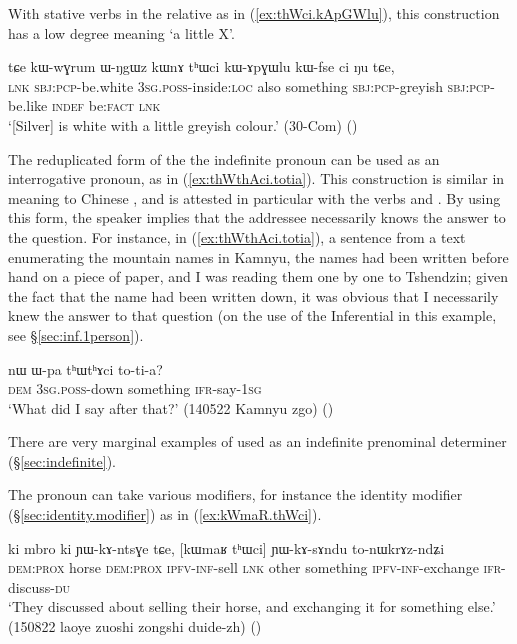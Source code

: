 With stative verbs in the relative as in (\ref{ex:thWci.kApGWlu}), this construction has a low degree meaning `a little X'.

\begin{exe}
\ex \label{ex:thWci.kApGWlu}
\gll   tɕe kɯ-wɣrum ɯ-ŋgɯz kɯnɤ tʰɯci kɯ-ɤpɣɯlu kɯ-fse ci ŋu tɕe, \\
\textsc{lnk} \textsc{sbj}:\textsc{pcp}-be.white \textsc{3sg}.\textsc{poss}-inside:\textsc{loc} also something \textsc{sbj}:\textsc{pcp}-greyish \textsc{sbj}:\textsc{pcp}-be.like \textsc{indef} be:\textsc{fact} \textsc{lnk} \\
\glt `[Silver] is white with a little greyish colour.' (30-Com)
()
\end{exe}
  
 The reduplicated form of the the indefinite pronoun  can be used as an interrogative pronoun, as in (\ref{ex:thWthAci.totia}). This construction is similar in meaning to Chinese , and is attested in particular with the verbs  and . By using this form, the speaker implies that the addressee necessarily knows the answer to the question. For instance,  in (\ref{ex:thWthAci.totia}), a sentence from a text enumerating the mountain names in Kamnyu, the names had been written before hand on a piece of paper, and I was reading them one by one to Tshendzin; given the fact that the name had been written down, it was obvious that I necessarily knew the answer to that question (on the use of the Inferential in this example, see §\ref{sec:inf.1person}).
  
 \begin{exe}
\ex \label{ex:thWthAci.totia}
 \gll  nɯ ɯ-pa tʰɯtʰɤci to-ti-a? \\
 \textsc{dem} \textsc{3sg}.\textsc{poss}-down something \textsc{ifr}-say-\textsc{1sg} \\
 \glt `What did I say after that?' (140522 Kamnyu zgo) ()
\end{exe} 

 There are very marginal examples of  used as an indefinite prenominal determiner (§\ref{sec:indefinite}).

The pronoun  can take various modifiers, for instance the identity modifier  (§\ref{sec:identity.modifier})  as in (\ref{ex:kWmaR.thWci}). 
 
\begin{exe}
\ex \label{ex:kWmaR.thWci}
\gll    ki mbro ki ɲɯ-kɤ-ntsɣe tɕe, [kɯmaʁ tʰɯci] ɲɯ-kɤ-sɤndu to-nɯkrɤz-ndʑi \\
\textsc{dem}:\textsc{prox} horse \textsc{dem}:\textsc{prox} \textsc{ipfv}-\textsc{inf}-sell \textsc{lnk} other  something   \textsc{ipfv}-\textsc{inf}-exchange \textsc{ifr}-discuss-\textsc{du} \\
 \glt `They discussed about selling their horse, and exchanging it for something else.' (150822 laoye zuoshi zongshi duide-zh)
()
\end{exe}


